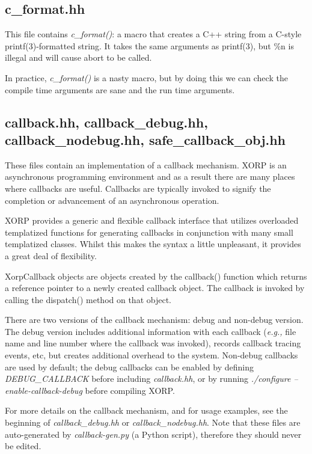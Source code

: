 \documentclass[11pt]{article}
\newcommand{\eg}{\emph{e.g.,}\xspace}
\begin{document}
\subsection{c\_format.hh}

This file contains \emph{c\_format()}: a macro that creates a C++ string
from a C-style printf(3)-formatted string.
It takes the same arguments as printf(3), but \%n is illegal and
will cause abort to be called.

In practice, \emph{c\_format()} is a nasty macro, but by doing this we can
check the compile time arguments are sane and the run time arguments.


\subsection{callback.hh, callback\_debug.hh, callback\_nodebug.hh,
 safe\_callback\_obj.hh}

These files contain an implementation of a callback mechanism.
XORP is an asynchronous programming environment and as a result there
are many places where callbacks are useful.  Callbacks are typically
invoked to signify the completion or advancement of an asynchronous
operation.

XORP provides a generic and flexible callback interface that utilizes
overloaded templatized functions for generating callbacks in
conjunction with many small templatized classes. Whilst this makes the
syntax a little unpleasant, it provides a great deal of flexibility.

XorpCallback objects are objects created by the callback()
function which returns a reference pointer to a newly created
callback object.  The callback is invoked by calling the dispatch()
method on that object.

There are two versions of the callback mechanism: debug and non-debug
version. The debug version includes additional information with
each callback (\eg file name and line number where the callback was invoked),
records callback tracing events, etc, but creates additional overhead
to the system. Non-debug callbacks are used by default; the debug
callbacks can be enabled by defining \emph{DEBUG\_CALLBACK}
before including \emph{callback.hh}, or by running
\emph{./configure --enable-callback-debug} before compiling XORP.

For more details on the callback mechanism, and for usage examples, see
the beginning of \emph{callback\_debug.hh} or \emph{callback\_nodebug.hh}.
Note that these files are auto-generated by \emph{callback-gen.py}
(a Python script), therefore they should never be edited.
\end{document}
